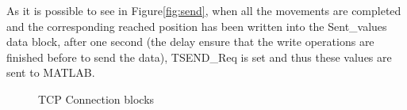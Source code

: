 As it is possible to see in Figure\ref{fig:send}, when all the movements are completed and the corresponding reached position has been written into the Sent\_values data block, after one second (the delay ensure that the write operations are finished before to send the data), TSEND\_Req is set and thus these values are sent to MATLAB. 

\begin{figure}[!h]
\centering
{}
\qquad
{}
\qquad
{}
\qquad
{}
\caption{TCP Connection blocks}
\label{fig:segments_2_3_4_5}
\end{figure}

